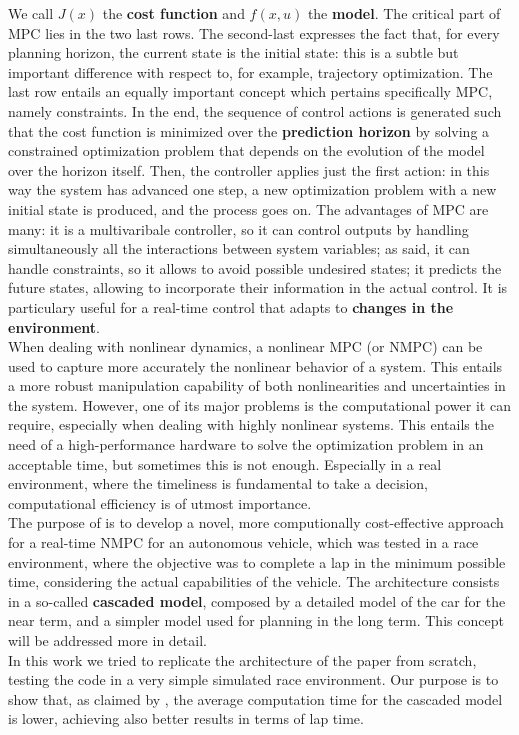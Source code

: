 \documentclass[a4paper, onecolumn, 12pt]{article}
\begin{document}
We call $J(x)$ the \textbf{cost function} and $f(x,u)$ the \textbf{model}. The
critical part of MPC lies in the two last rows. The second-last expresses the
fact that, for every planning horizon, the current state is the initial state:
this is a subtle but important difference with respect to, for example,
trajectory optimization. The last row entails an equally important concept which
pertains specifically MPC, namely constraints. In the end, the sequence of
control actions is generated such that the cost function is minimized over the
\textbf{prediction horizon} by solving a constrained optimization problem that
depends on the evolution of the model over the horizon itself. Then, the
controller applies just the first action: in this way the system has advanced
one step, a new optimization problem with a new initial state is produced, and
the process goes on. The advantages of MPC are many: it is a multivaribale
controller, so it can control outputs by handling simultaneously all the
interactions between system variables; as said, it can handle constraints, so it
allows to avoid possible undesired states; it predicts the future states,
allowing to incorporate their information in the actual control. It is
particulary useful for a real-time control that adapts to \textbf{changes in the
environment}.\\
When dealing with nonlinear dynamics, a nonlinear MPC (or NMPC) can be used to
capture more accurately the nonlinear behavior of a system. This entails a more
robust manipulation capability of both nonlinearities and uncertainties in the
system. However, one of its major problems is the computational power it can
require, especially when dealing with highly nonlinear systems. This entails the
need of a high-performance hardware to solve the optimization problem in an
acceptable time, but sometimes this is not enough. Especially in a real
environment, where the timeliness is fundamental to take a decision,
computational efficiency is of utmost importance.\\
The purpose of \cite{paper} is to develop a novel, more computionally
cost-effective approach for a real-time NMPC for an autonomous vehicle, which
was tested in a race environment, where the objective was to complete a lap in
the minimum possible time, considering the actual capabilities of the vehicle.
The architecture consists in a so-called \textbf{cascaded model}, composed by a
detailed model of the car for the near term, and a simpler model used for
planning in the long term. This concept will be addressed more in detail.\\
In this work we tried to replicate the architecture of the paper from scratch,
testing the code in a very simple simulated race environment. Our purpose is to
show that, as claimed by \cite{paper}, the average computation time for the
cascaded model is lower, achieving also better results in terms of lap time.
\end{document}
